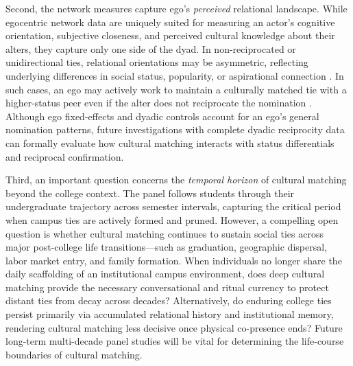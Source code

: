 \documentclass[12pt,letterpaper]{article}
\begin{document}
Second, the network measures capture ego's \textit{perceived} relational landscape. While egocentric network data are uniquely suited for measuring an actor's cognitive orientation, subjective closeness, and perceived cultural knowledge about their alters, they capture only one side of the dyad. In non-reciprocated or unidirectional ties, relational orientations may be asymmetric, reflecting underlying differences in social status, popularity, or aspirational connection \citep{carley1996cognitive-8e6}. In such cases, an ego may actively work to maintain a culturally matched tie with a higher-status peer even if the alter does not reciprocate the nomination \citep{mcfarland2014network-735}. Although ego fixed-effects and dyadic controls account for an ego's general nomination patterns, future investigations with complete dyadic reciprocity data can formally evaluate how cultural matching interacts with status differentials and reciprocal confirmation.


Third, an important question concerns the \textit{temporal horizon} of cultural matching beyond the college context. The panel follows students through their undergraduate trajectory across semester intervals, capturing the critical period when campus ties are actively formed and pruned. However, a compelling open question is whether cultural matching continues to sustain social ties across major post-college life transitions---such as graduation, geographic dispersal, labor market entry, and family formation. When individuals no longer share the daily scaffolding of an institutional campus environment, does deep cultural matching provide the necessary conversational and ritual currency to protect distant ties from decay across decades? Alternatively, do enduring college ties persist primarily via accumulated relational history and institutional memory, rendering cultural matching less decisive once physical co-presence ends? Future long-term multi-decade panel studies will be vital for determining the life-course boundaries of cultural matching.
\end{document}
